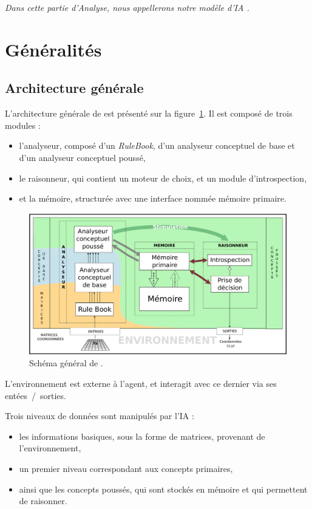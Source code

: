 \emph{Dans cette partie d'Analyse, nous appellerons notre modèle d'IA \cogito{}.}

\section{Généralités}

\subsection{Architecture générale}
\label{subsection_architecture_generale}
L'architecture générale de \cogito{} est présenté sur la figure~\ref{schema_general}. Il est composé de trois modules :
\begin{itemize}
\item l'analyseur, composé d'un \emph{RuleBook}, d'un analyseur conceptuel de base et d'un analyseur conceptuel poussé,
\item le raisonneur, qui contient un moteur de choix, et un module d'introspection,
\item et la mémoire, structurée avec une interface nommée mémoire primaire.
\end{itemize}

\begin{figure}[H] 
\includegraphics[width=\textwidth]{files/simplified_general_diagram} 
\caption{Schéma général de \cogito{}.} 
\label{schema_general}
\end{figure}

L'environnement est externe à l'agent, et interagit avec ce dernier via ses entées~/~sorties.

Trois niveaux de données sont manipulés par l'IA :
\begin{itemize}
\item les informations basiques, sous la forme de matrices, provenant de l'environnement,
\item un premier niveau correspondant aux concepts primaires,
\item ainsi que les concepts poussés, qui sont stockés en mémoire et qui permettent de raisonner.
\end{itemize}

